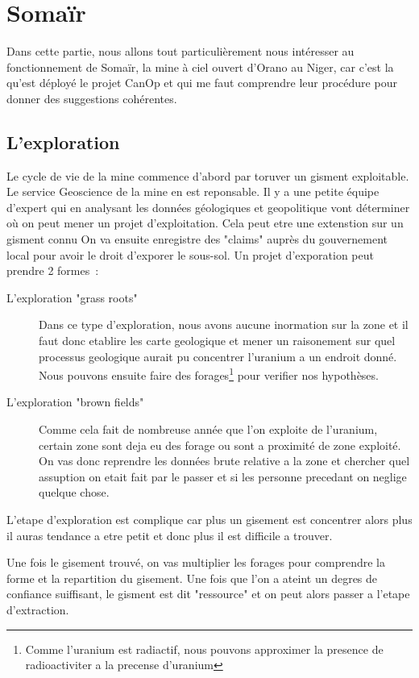 

\section{Somaïr}
Dans cette partie, nous allons tout particulièrement nous intéresser au fonctionnement de Somaïr, la mine à ciel ouvert d'Orano au Niger, car c'est la qu'est déployé le projet CanOp et qui me faut comprendre leur procédure pour donner des suggestions cohérentes.
\subsection{L'exploration}

Le cycle de vie de la mine commence d'abord par toruver un gisment exploitable. Le service Geoscience de la mine en est reponsable. Il y a une petite équipe d'expert qui en analysant les données géologiques et geopolitique vont déterminer où on peut mener un projet d'exploitation. Cela peut etre une extenstion sur un gisment connu On va ensuite enregistre des "claims" auprès du gouvernement local pour avoir le droit d'exporer le sous-sol. Un projet d'exporation peut prendre 2 formes~:
\begin{description}
    \item[L'exploration "grass roots"] Dans ce type d'exploration, nous avons aucune inormation sur la zone et il faut donc etablire les carte geologique et mener un raisonement sur quel processus geologique aurait pu concentrer l'uranium a un endroit donné. Nous pouvons ensuite faire des forages\footnote{Comme l'uranium est radiactif, nous pouvons approximer la presence de radioactiviter a la precense d'uranium} pour verifier nos hypothèses. %
    \item[L'exploration "brown fields"] Comme cela fait de nombreuse année que l'on exploite de l'uranium, certain zone sont deja eu des forage ou sont a proximité de zone exploité. On vas donc reprendre les données brute relative a la zone et chercher quel assuption on etait fait par le passer et si les personne precedant on neglige quelque chose.
\end{description}
L'etape d'exploration est complique car plus un gisement est concentrer alors plus il auras tendance a etre petit et donc plus il est difficile a trouver.

Une fois le gisement trouvé, on vas multiplier les forages pour comprendre la forme et la repartition du gisement. Une fois que l'on a ateint un degres de confiance suiffisant, le gisment est dit "ressource" et on peut alors passer a l'etape d'extraction.







